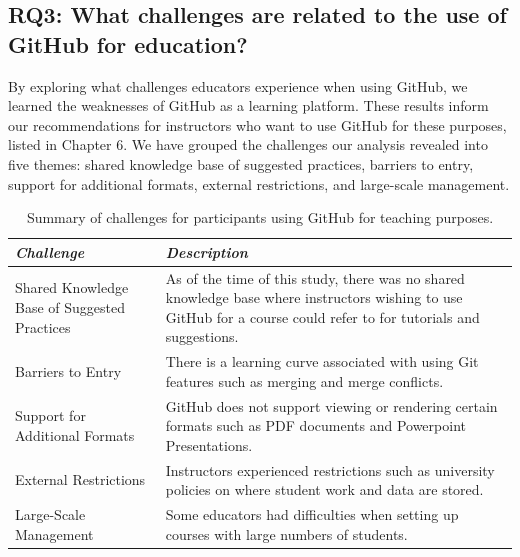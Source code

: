\subsection{RQ3: What challenges are related to the use of GitHub for education?}
By exploring what challenges educators experience when using GitHub, we learned the weaknesses of GitHub as a learning platform. These results inform our recommendations for instructors who want to use GitHub for these purposes, listed in Chapter 6. We have grouped the challenges our analysis revealed into five themes: shared knowledge base of suggested practices, barriers to entry, support for additional formats, external restrictions, and large-scale management.

\begin{table}[h]
    \vspace{1pt}
        \caption{Summary of challenges for participants using GitHub for teaching purposes.}\label{table:interviews:challenges}
    \vspace{1pt}
    \begin{center}
        \begin{tabular}{ | m{3cm} | m{12cm} | }
            \hline
            \emph{Challenge} & \emph{Description} \\
            \hline
            Shared Knowledge Base of Suggested Practices & As of the time of this study, there was no shared knowledge base where instructors wishing to use GitHub for a course could refer to for tutorials and suggestions. \\
            \hline
            Barriers to Entry & There is a learning curve associated with using Git features such as merging and merge conflicts. \\
            \hline
            Support for Additional Formats & GitHub does not support viewing or rendering certain formats such as PDF documents and Powerpoint Presentations. \\
            \hline
            External Restrictions & Instructors experienced restrictions such as university policies on where student work and data are stored. \\
            \hline
            Large-Scale Management & Some educators had difficulties when setting up courses with large numbers of students. \\
            \hline
        \end{tabular}
    \end{center}
\end{table}

